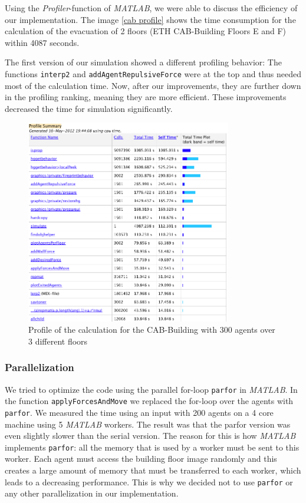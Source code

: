 \documentclass[11pt]{article}
\begin{document}
Using the \textit{Profiler}-function of \textit{MATLAB}, we were able to discuss
the efficiency of our implementation. The image \vref{cab profile} shows the
time consumption for the calculation of the evacuation of 2 floors (ETH
CAB-Building Floors E and F) within 4087 seconds.

The first version of our simulation showed a different profiling behavior: The
functions \verb+interp2+ and \verb+addAgentRepulsiveForce+ were at the top and
thus needed most of the calculation time. Now, after our improvements, they are
further down in the profiling ranking, meaning they are more efficient. These
improvements decreased the time for simulation significantly.

\begin{figure}[ht]
\centering
\includegraphics[width=0.8\textwidth]{./images/profiler.png}
\caption{Profile of the calculation for the CAB-Building with 300 agents over 3 different floors} 
\label{cab profile}
\end{figure}

\subsubsection{Parallelization}

We tried to optimize the code using the parallel for-loop \verb+parfor+ in
\textit{MATLAB}. In the function \verb+applyForcesAndMove+ we replaced the
for-loop over the agents with \verb+parfor+. We measured the time using an input
with 200 agents on a 4 core machine using 5 \textit{MATLAB} workers. The result
was that the parfor version was even slightly slower than the serial version.
The reason for this is how \textit{MATLAB} implements \verb+parfor+: all the
memory that is used by a worker must be sent to this worker.  Each agent must
access the building floor image randomly and this creates a large amount of
memory that must be transferred to each worker, which leads to a decreasing
performance.  This is why we decided not to use \verb+parfor+ or any other
parallelization in our implementation.
\end{document}
